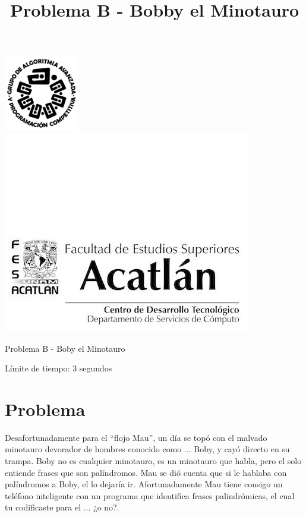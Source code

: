 \documentclass[letter,10pt]{article}
\date{}
\begin{document}
\title{Problema B - Bobby el Minotauro}

\includegraphics[scale=0.6]{logo} \hspace*{9.00cm}
\includegraphics[scale=0.5]{dsc} 
\bigskip
\begin{center}
    \Large Problema B - Boby el Minotauro
\end{center}

\begin{flushright}
Límite de tiempo: 3 segundos
\par\end{flushright}
\bigskip

\section*{Problema}

Desafortunadamente para el ``flojo Mau'', un día se topó con el malvado minotauro devorador de hombres conocido como ... Boby, y cayó directo en su trampa. Boby no es cualquier minotauro, es un minotauro que habla, pero el solo entiende frases que son palíndromos. Mau se dió cuenta que si le hablaba con palíndromos a Boby, el lo dejaría ir.
Afortunadamente Mau tiene consigo un teléfono inteligente con un programa que identifica frases palindrómicas, el cual tu codificaste para el ... ¿o no?.
\end{document}
